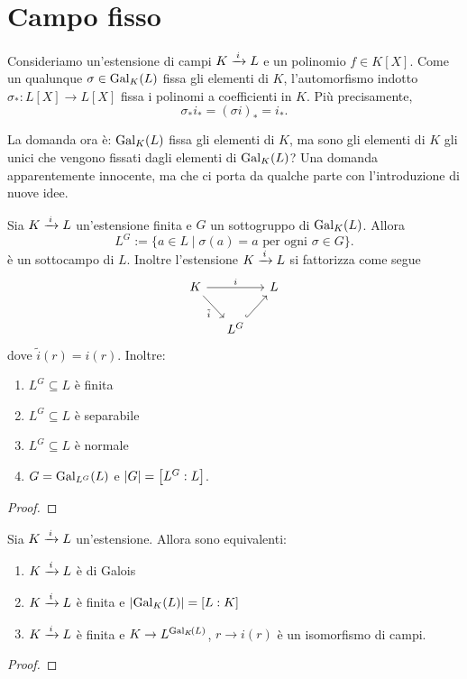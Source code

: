 
\section{Campo fisso}

Consideriamo un'estensione di campi \(K \mor i L\) e un polinomio \(f \in K[X]\). Come un qualunque \(\sigma \in \Gal[K]L\) fissa gli elementi di \(K\), l'automorfismo indotto \(\sigma_\ast : L[X] \to L[X]\) fissa i polinomi a coefficienti in \(K\). Più precisamente,
\[\sigma_\ast i_\ast = (\sigma i)_\ast = i_\ast .\]

La domanda ora è: \(\Gal[K]L\) fissa gli elementi di \(K\), ma sono gli elementi di \(K\) gli unici che vengono fissati dagli elementi di \(\Gal[K]L\)? Una domanda apparentemente innocente, ma che ci porta da qualche parte con l'introduzione di nuove idee.

\begin{prop}
  Sia \(K \mor i L\) un'estensione finita e \(G\) un sottogruppo di \(\Gal[K]L\). Allora
\[ L^G := \{a \in L \mid \sigma(a) = a \text{ per ogni } \sigma \in G\} .\]
è un sottocampo di \(L\). Inoltre l'estensione \(K \mor i L\) si fattorizza come segue
\[\begin{tikzcd}[column sep=small]
K \ar["i", rr] \ar["{\tilde i}",dr, swap] & & L \\
                 & L^G \ar[hookrightarrow, ur]
\end{tikzcd}\]
dove \(\tilde i (r) = i(r)\). Inoltre:
\begin{enumerate}
\item \(L^G \subseteq L\) è finita
\item \(L^G \subseteq L\) è separabile
\item \(L^G \subseteq L\) è normale
\item \(G = \Gal[L^G]L\) e \(\card G = \left[L^G:L\right]\).
\end{enumerate}
\end{prop}

\begin{proof}
\end{proof}

\begin{coro}
Sia \(K \mor i L\) un'estensione. Allora sono equivalenti:
\begin{enumerate}
\item \(K \mor i L\) è di Galois
\item \(K \mor i L\) è finita e \(\card{\Gal[K]L} = [L:K]\)
\item \(K \mor i L\) è finita e \(K \to L^{\Gal[K]L}\), \(r \to i(r)\) è un isomorfismo di campi.
\end{enumerate}
\end{coro}

\begin{proof}
\end{proof}